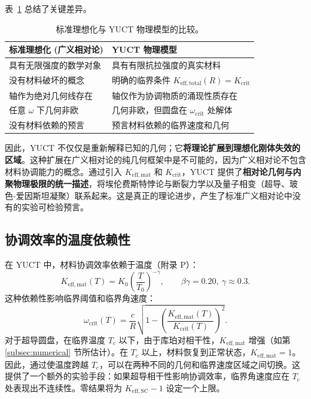 \documentclass[12pt,a4paper]{article}
\newcommand{\Keffmat}{K_{\mathrm{eff,mat}}}
\newcommand{\Kefftot}{K_{\mathrm{eff,total}}}
\newcommand{\Kcrit}{K_{\mathrm{crit}}}
\begin{document}
	表~\ref{tab:idealization} 总结了关键差异。
	
	\begin{table}[h]
		\centering
		\caption{标准理想化与 YUCT 物理模型的比较。}
		\label{tab:idealization}
		\begin{tabular}{p{5cm}p{5cm}}
			\toprule
			\textbf{标准理想化 (广义相对论)} & \textbf{YUCT 物理模型} \\
			\midrule
			具有无限强度的数学对象 & 具有有限抗拉强度的真实材料 \\
			没有材料破坏的概念 & 明确的临界条件 \(\Kefftot(R) = \Kcrit\) \\
			轴作为绝对几何线存在 & 轴仅作为协调物质的涌现性质存在 \\
			任意 \(\omega\) 下几何非欧 & 几何非欧，但圆盘在 \(\omega_{\text{crit}}\) 处解体 \\
			没有材料依赖的预言 & 预言材料依赖的临界速度和几何 \\
			\bottomrule
		\end{tabular}
	\end{table}
	
	因此，YUCT 不仅仅是重新解释已知的几何；它\textbf{将理论扩展到理想化刚体失效的区域}。这种扩展在广义相对论的纯几何框架中是不可能的，因为广义相对论不包含材料协调能力的概念。通过引入 \(\Keffmat\) 和 \(\Kcrit\)，YUCT 提供了\textbf{相对论几何与内聚物理极限的统一描述}，将埃伦费斯特悖论与断裂力学以及量子相变（超导、玻色-爱因斯坦凝聚）联系起来。这是真正的理论进步，产生了标准广义相对论中没有的实验可检验预言。
	
	\subsection{协调效率的温度依赖性}
	
	在 YUCT 中，材料协调效率依赖于温度（附录 P）：
	\[
	K_{\mathrm{eff,mat}}(T) = K_0 \left( \frac{T}{T_0} \right)^{-\gamma}, \qquad \beta\gamma = 0.20,\ \gamma \approx 0.3.
	\]
	这种依赖性影响临界阈值和临界角速度：
	\[
	\omega_{\text{crit}}(T) = \frac{c}{R} \sqrt{1 - \left( \frac{K_{\mathrm{eff,mat}}(T)}{K_{\mathrm{crit}}(T)} \right)^2 }.
	\]
	对于超导圆盘，在临界温度 \(T_c\) 以下，由于库珀对相干性，\(K_{\mathrm{eff,mat}}\) 增强（如第 \ref{subsec:numerical} 节所估计）。在 \(T_c\) 以上，材料恢复到正常状态，\(K_{\mathrm{eff,mat}} = 1\)。因此，通过使温度跨越 \(T_c\)，可以在两种不同的几何和临界速度区域之间切换。这提供了一个额外的实验手段：如果超导相干性影响协调效率，临界角速度应在 \(T_c\) 处表现出不连续性。零结果将为 \(K_{\mathrm{eff,SC}} - 1\) 设定一个上限。
	
\end{document}
